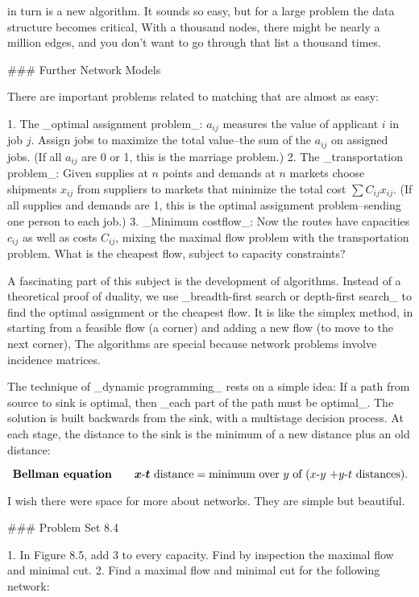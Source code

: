 in turn is a new algorithm. It sounds so easy, but for a large problem the data structure becomes critical, With a thousand nodes, there might be nearly a million edges, and you don't want to go through that list a thousand times.

### Further Network Models

There are important problems related to matching that are almost as easy:

1. The _optimal assignment problem_: \(a_{ij}\) measures the value of applicant \(i\) in job \(j\). Assign jobs to maximize the total value--the sum of the \(a_{ij}\) on assigned jobs. (If all \(a_{ij}\) are 0 or 1, this is the marriage problem.)
2. The _transportation problem_: Given supplies at \(n\) points and demands at \(n\) markets choose shipments \(x_{ij}\) from suppliers to markets that minimize the total cost \(\sum C_{ij}x_{ij}\). (If all supplies and demands are 1, this is the optimal assignment problem--sending one person to each job.)
3. _Minimum costflow_: Now the routes have capacities \(c_{ij}\) as well as costs \(C_{ij}\), mixing the maximal flow problem with the transportation problem. What is the cheapest flow, subject to capacity constraints?

A fascinating part of this subject is the development of algorithms. Instead of a theoretical proof of duality, we use _breadth-first search or depth-first search_ to find the optimal assignment or the cheapest flow. It is like the simplex method, in starting from a feasible flow (a corner) and adding a new flow (to move to the next corner), The algorithms are special because network problems involve incidence matrices.

The technique of _dynamic programming_ rests on a simple idea: If a path from source to sink is optimal, then _each part of the path must be optimal_. The solution is built backwards from the sink, with a multistage decision process. At each stage, the distance to the sink is the minimum of a new distance plus an old distance:

\[\mbox{\bf Bellman equation}\qquad\mbox{\boldmath$x$-$t$ distance}=\mbox{minimum over $y$ of ($x$-$y$ +$y$-$t$ distances)}.\]

I wish there were space for more about networks. They are simple but beautiful.

### Problem Set 8.4

1. In Figure 8.5, add 3 to every capacity. Find by inspection the maximal flow and minimal cut.
2. Find a maximal flow and minimal cut for the following network: 